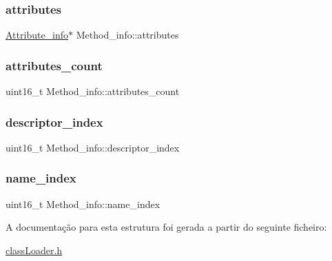 \subsubsection{\texorpdfstring{attributes}{attributes}}
{\footnotesize\ttfamily \hyperlink{struct_attribute__info}{Attribute\+\_\+info}$\ast$ Method\+\_\+info\+::attributes}

\hypertarget{struct_method__info_afd638bcc6f20cfa8dd1de8741c8b5493}{}\label{struct_method__info_afd638bcc6f20cfa8dd1de8741c8b5493} 
\subsubsection{\texorpdfstring{attributes\+\_\+count}{attributes\_count}}
{\footnotesize\ttfamily uint16\+\_\+t Method\+\_\+info\+::attributes\+\_\+count}

\hypertarget{struct_method__info_af713175c97f681296e801e0c11e0ae34}{}\label{struct_method__info_af713175c97f681296e801e0c11e0ae34} 
\subsubsection{\texorpdfstring{descriptor\+\_\+index}{descriptor\_index}}
{\footnotesize\ttfamily uint16\+\_\+t Method\+\_\+info\+::descriptor\+\_\+index}

\hypertarget{struct_method__info_ad1f067bfd8d2d231f598824676dc7851}{}\label{struct_method__info_ad1f067bfd8d2d231f598824676dc7851} 
\subsubsection{\texorpdfstring{name\+\_\+index}{name\_index}}
{\footnotesize\ttfamily uint16\+\_\+t Method\+\_\+info\+::name\+\_\+index}



A documentação para esta estrutura foi gerada a partir do seguinte ficheiro\+:\begin{DoxyCompactItemize}
\item 
\hyperlink{class_loader_8h}{class\+Loader.\+h}\end{DoxyCompactItemize}
